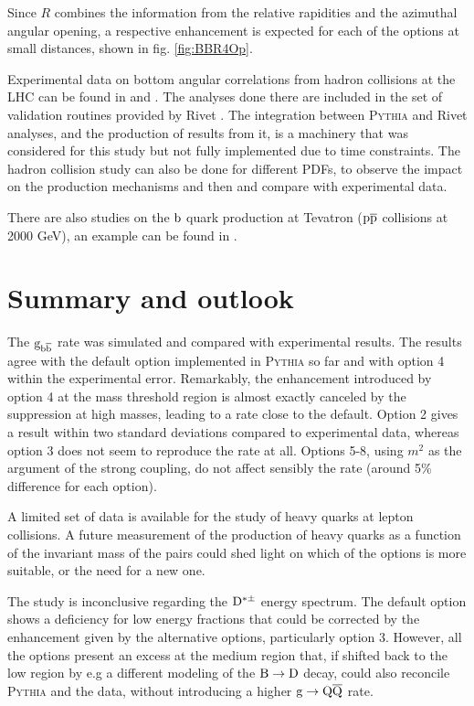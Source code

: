 \documentclass[a4paper,12pt]{article}
\begin{document}
Since $R$ combines the information from the relative rapidities and the azimuthal angular opening, a respective enhancement is expected for each of the options at small distances, shown in fig. \ref{fig:BBR4Op}.

Experimental data on bottom angular correlations from hadron collisions at the LHC can be found in \cite{Khachatryan:2011wq} and \cite{ATLAS:2011ac}. The analyses done there are included in the set of validation routines provided by Rivet \cite{Buckley:2010ar}. The integration between \textsc{Pythia} and Rivet analyses, and the production of results from it, is a machinery that was considered for this study but not fully implemented due to time constraints. The hadron collision study can also be done for different PDFs, to observe the impact on the production mechanisms and then and compare with experimental data. 

There are also studies on the ${\mathrm b}$ quark production at Tevatron (${\mathrm p}\overline{\mathrm p}$ collisions at 2000 GeV), an example can be found in \cite{vallecorsa}.

\section{Summary and outlook}
\label{sec:summary}

The ${\mathrm g}_{{\mathrm b}\overline{\mathrm b}}$ rate was simulated and compared with experimental results. The results agree with the default option implemented in \textsc{Pythia} so far and with option 4 within the experimental error. Remarkably, the enhancement introduced by option 4 at the mass threshold region is almost exactly canceled by the suppression at high masses, leading to a rate close to the default. Option 2 gives a result within two standard deviations compared to experimental data, whereas option 3 does not seem to reproduce the rate at all. Options 5-8, using $m^2$ as the argument of the strong coupling, do not affect sensibly the rate (around 5\% difference for each option).

A limited set of data is available for the study of heavy quarks at lepton collisions. A future measurement of the production of heavy quarks as a function of the invariant mass of the pairs could shed light on which of the options is more suitable, or the need for a new one.

The study is inconclusive regarding the ${\mathrm D}^{*\pm}$ energy spectrum. The default option shows a deficiency for low energy fractions that could be corrected by the enhancement given by the alternative options, particularly option 3. However, all the options present an excess at the medium region that, if shifted back to the low region by e.g a different modeling of the ${\mathrm B}\to{\mathrm D}$ decay, could also reconcile \textsc{Pythia}  and the data, without introducing a higher ${\mathrm g}\to{\mathrm Q}\overline{\mathrm Q}$ rate.
\end{document}
